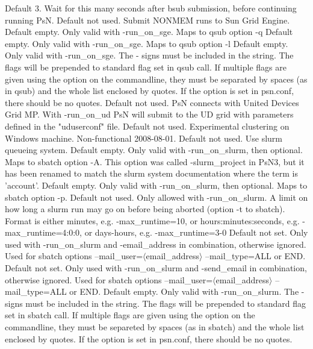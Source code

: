 \begin{optionlist}
Default 3. Wait for this many seconds after bsub submission, before continuing running PsN. 
\nextopt
{}
Default not used. Submit NONMEM runs to Sun Grid Engine.
\nextopt
{}
Default empty. Only valid with -run\_on\_sge. Maps to qsub option -q 
\nextopt
{}
Default empty. Only valid with -run\_on\_sge. Maps to qsub option -l 
\nextopt
{}
Default empty. Only valid with -run\_on\_sge. The - signs must be included in the string. The flags will be prepended to standard flag set in qsub call. If multiple flags are given using the option on the commandline, they must be separated by spaces (as in qsub) and the whole list enclosed by quotes. If the option is set in psn.conf, there should be no quotes. 
\nextopt
{}
Default not used. PsN connects with United Devices Grid MP. With -run\_on\_ud PsN will submit to the UD grid with parameters defined in the "uduserconf" file. 
\nextopt
{}
Default not used. Experimental clustering on Windows machine. Non-functional 2008-08-01. 
\nextopt
{}
Default not used. Use slurm queueing system.
\nextopt
{}
Default empty. Only valid with -run\_on\_slurm, then optional. Maps to sbatch option -A. This option was called -slurm\_project in PsN3, but it has been renamed to match the slurm system documentation where the term is 'account'.
\nextopt
{}
Default empty. Only valid with -run\_on\_slurm, then optional. Maps to sbatch option -p.
\nextopt
{}
Default not used. Only allowed with -run\_on\_slurm. A limit on how long a slurm run may go on before being aborted (option -t to sbatch). Format is either minutes, e.g. -max\_runtime=10, or hours:minutes:seconds, e.g. -max\_runtime=4:0:0, or days-hours, e.g. -max\_runtime=3-0 
\nextopt
{}
Default not set. Only used with -run\_on\_slurm and -email\_address in combination, otherwise ignored. Used for sbatch options --mail\_user=$\langle$email\_address$\rangle$ --mail\_type=ALL or END.  
\nextopt
{}
Default not set. Only used with -run\_on\_slurm and -send\_email in combination, otherwise ignored. Used for sbatch options --mail\_user=$\langle$email\_address$\rangle$ --mail\_type=ALL or END.  
\nextopt
{}
Default empty. Only valid with -run\_on\_slurm. The - signs must be included in the string. The flags will be prepended to standard flag set in sbatch call. If multiple flags are given using the option on the commandline, they must be separeted by spaces (as in sbatch) and the whole list enclosed by quotes. If the option is set in psn.conf, there should be no quotes. 
\nextopt
\end{optionlist}



